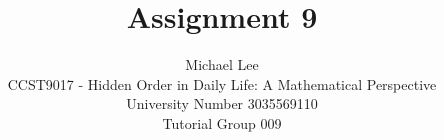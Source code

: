 \documentclass[12pt]{article}
\begin{document}


\title{Assignment 9}%
\author{Michael Lee\\ %
	CCST9017 - Hidden Order in Daily Life: A Mathematical Perspective \\
	University Number 3035569110 \\
	Tutorial Group 009
} %


\maketitle
\end{document}
